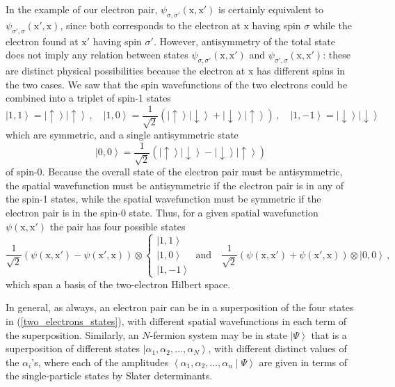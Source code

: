 \documentclass{article}
\theoremstyle{plain}\theoremheaderfont{\normalfont\itshape}\theorembodyfont{\rmfamily}\theoremseparator{.}\newtheorem*{rem}{Remark}\newtheorem*{ex}{Example}\newtheorem*{proof}{Proof}\newtheorem*{altp}{Alternative proof}
\theoremstyle{plain}\theoremheaderfont{\normalfont\bfseries}\theorembodyfont{\rmfamily}\theoremseparator{.}\newtheorem{thm}{Theorem}[section]\newtheorem{lem}[thm]{Lemma}\newtheorem{prop}[thm]{Proposition}\newtheorem*{cor}{Corollary}\newtheorem{defn}[thm]{Definition}\newtheorem{clm}[thm]{Claim}\newtheorem{clminproof}{Claim}
\theoremstyle{break}\theoremheaderfont{\normalfont\itshape}\theorembodyfont{\rmfamily}\theoremseparator{.\medskip}\newtheorem*{proofskip}{Proof}\newtheorem*{exs}{Examples}\newtheorem*{rems}{Remarks}
\theoremstyle{break}\theoremheaderfont{\normalfont\bfseries}\theorembodyfont{\rmfamily}\theoremseparator{.\medskip}\newtheorem{lemskip}[thm]{Lemma}\newtheorem{defnskip}[thm]{Definition}\newtheorem{propskip}[thm]{Proposition}\newtheorem{thmskip}[thm]{Theorem}
\numberwithin{equation}{section}
\newcommand{\ket}[1]{\left| #1 \right\rangle}
\newcommand{\braket}[2]{\left\langle #1 \middle| #2 \right\rangle}
\newcommand{\vb}[1]{\bm{\mathrm{#1}}}
\begin{document}
    In the example of our electron pair, \(\psi_{\sigma,\sigma'}(\vb{x},\vb{x}')\) is certainly equivalent to \(\psi_{\sigma',\sigma}(\vb{x}',\vb{x})\), since both corresponds to the electron at \(\vb{x}\) having spin \(\sigma\) while the electron found at \(\vb{x}'\) having spin \(\sigma'\). However, antisymmetry of the total state does not imply any relation between states \(\psi_{\sigma,\sigma'}(\vb{x},\vb{x}')\) and \(\psi_{\sigma',\sigma}(\vb{x},\vb{x}')\): these are distinct physical possibilities because the electron at \(\vb{x}\) has different spins in the two cases. We saw that the spin wavefunctions of the two electrons could be combined into a triplet of spin-1 states
    \begin{equation}
        \ket{1,1}=\ket{\uparrow}\ket{\uparrow}\,,\quad\ket{1,0}=\frac{1}{\sqrt{2}}\left(\ket{\uparrow}\ket{\downarrow}+\ket{\downarrow}\ket{\uparrow}\right)\,,\quad\ket{1,-1}=\ket{\downarrow}\ket{\downarrow}
    \end{equation}
    which are symmetric, and a single antisymmetric state
    \begin{equation}
        \ket{0,0}=\frac{1}{\sqrt{2}}\left(\ket{\uparrow}\ket{\downarrow}-\ket{\downarrow}\ket{\uparrow}\right)
    \end{equation}
    of spin-0. Because the overall state of the electron pair must be antisymmetric, the spatial wavefunction must be antisymmetric if the electron pair is in any of the spin-1 states, while the spatial wavefunction must be symmetric if the electron pair is in the spin-0 state. Thus, for a given spatial wavefunction \(\psi(\vb{x},\vb{x}')\) the pair has four possible states
    \begin{equation}\label{two_electrons_states}
        \frac{1}{\sqrt{2}}\left(\psi(\vb{x},\vb{x}')-\psi(\vb{x}',\vb{x})\right)\otimes\begin{cases}
            \ket{1,1} \\ \ket{1,0} \\ \ket{1,-1}
        \end{cases}\ \text{and}\quad\frac{1}{\sqrt{2}}\left(\psi(\vb{x},\vb{x}')+\psi(\vb{x}',\vb{x})\right)\otimes\ket{0,0}\,,
    \end{equation}
    which span a basis of the two-electron Hilbert space.

    In general, as always, an electron pair can be in a superposition of the four states in (\ref{two_electrons_states}), with different spatial wavefunctions in each term of the superposition. Similarly, an \(N\)-fermion system may be in state \(\ket{\Psi}\) that is a superposition of different states \(\ket{\alpha_1,\alpha_2,\dots,\alpha_N}\), with different distinct values of the \(\alpha_i\)'s, where each of the amplitudes \(\braket{\alpha_1,\alpha_2,\dots,\alpha_n}{\Psi}\) are given in terms of the single-particle states by Slater determinants.
\end{document}
